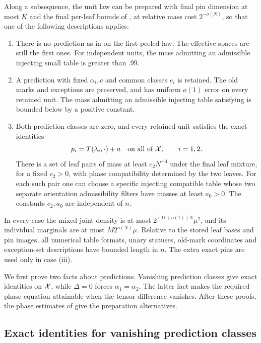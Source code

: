 \begin{proposition}
\label{prop:status-preparation}
Along a subsequence, the unit law can be prepared with final
pin dimension at most \(K\) and the final per-leaf bounds of
, at relative mass cost \(2^{-o(N)}\), so
that one of the following descriptions applies.
\begin{enumerate}[label=\textup{(\roman*)}]
\item There is no prediction as in 
on the first-peeled law. The effective spaces are still the
first ones. For independent units, the mass admitting an
admissible injecting small table is greater than \(.99\).
\item A prediction with fixed \(\alpha_i,c\) and common
classes \(e_i\) is retained. The old marks and exceptions
are preserved, and  has uniform \(o(1)\)
error on every retained unit. The mass admitting an
admissible injecting table satisfying
 is bounded below by a positive
constant.
\item Both prediction classes are zero, and every retained
unit satisfies the exact identities
\[
 p_i=T(\lambda_i,\cdot)+a
 \quad\text{on all of }\mathcal X,\qquad i=1,2.
\]
There is a set of leaf pairs of mass at least
\(c_2N^{-4}\) under the final leaf mixture, for a fixed
\(c_2>0\), with phase compatibility determined by the
two leaves. For each such pair one can choose a specific
injecting compatible table whose two separate orientation
admissibility filters have masses at least \(a_0>0\).
The constants \(c_2,a_0\) are independent of \(n\).
\end{enumerate}
In every case the mixed joint density is at most
\(2^{(D+o(1))N}\mu^2\), and its individual marginals are at
most \(M2^{o(N)}\mu\).
Relative to the stored leaf bases and pin images, all numerical
table formats, unary statuses, old-mark coordinates and exception-set
descriptions have bounded length in \(n\). The extra exact pins
are used only in case \textup{(iii)}.
\end{proposition}

We first prove two facts about predictions. Vanishing prediction
classes give exact identities on \(\mathcal X\), while \(\Delta=0\)
forces \(\alpha_1=\alpha_2\). The latter fact makes the required
phase equation attainable when the tensor difference vanishes.
After these proofs, the phase estimates of 
give the preparation alternatives.

\subsection{Exact identities for vanishing prediction classes}

